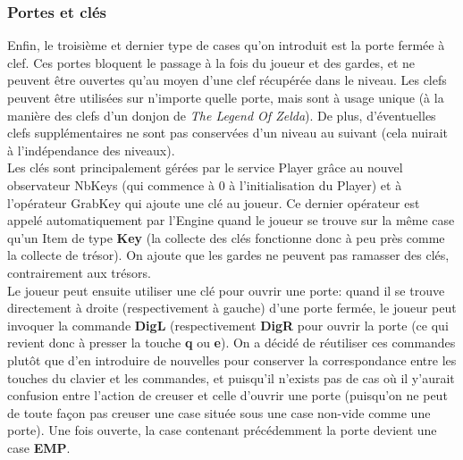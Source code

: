 \documentclass{article}
\begin{document}
\subsubsection{Portes et clés}
Enfin, le troisième et dernier type de cases qu'on introduit est la porte fermée à clef. Ces portes bloquent le passage à la fois du joueur et des gardes, et ne peuvent être ouvertes qu'au moyen d'une clef récupérée dans le niveau. Les clefs peuvent être utilisées sur n'importe quelle porte, mais sont à usage unique (à la manière des clefs d'un donjon de \textit{The Legend Of Zelda}). De plus, d'éventuelles clefs supplémentaires ne sont pas conservées d'un niveau au suivant (cela nuirait à l'indépendance des niveaux).\\

Les clés sont principalement gérées par le service \textrm{Player} grâce au nouvel observateur \textrm{NbKeys} (qui commence à 0 à l'initialisation du \textrm{Player}) et à l'opérateur \textrm{GrabKey} qui ajoute une clé au joueur. Ce dernier opérateur est appelé automatiquement par l'\textrm{Engine} quand le joueur se trouve sur la même case qu'un \textrm{Item} de type \textbf{Key} (la collecte des clés fonctionne donc à peu près comme la collecte de trésor). On ajoute que les gardes ne peuvent pas ramasser des clés, contrairement aux trésors.\\

Le joueur peut ensuite utiliser une clé pour ouvrir une porte: quand il se trouve directement à droite (respectivement à gauche) d'une porte fermée, le joueur peut invoquer la commande \textbf{DigL} (respectivement \textbf{DigR} pour ouvrir la porte (ce qui revient donc à presser la touche \textbf{q} ou \textbf{e}). On a décidé de réutiliser ces commandes plutôt que d'en introduire de nouvelles pour conserver la correspondance entre les touches du clavier et les commandes, et puisqu'il n'exists pas de cas où il y'aurait confusion entre l'action de creuser et celle d'ouvrir une porte (puisqu'on ne peut de toute façon pas creuser une case située sous une case non-vide comme une porte). Une fois ouverte, la case contenant précédemment la porte devient une case \textbf{EMP}.
\end{document}
